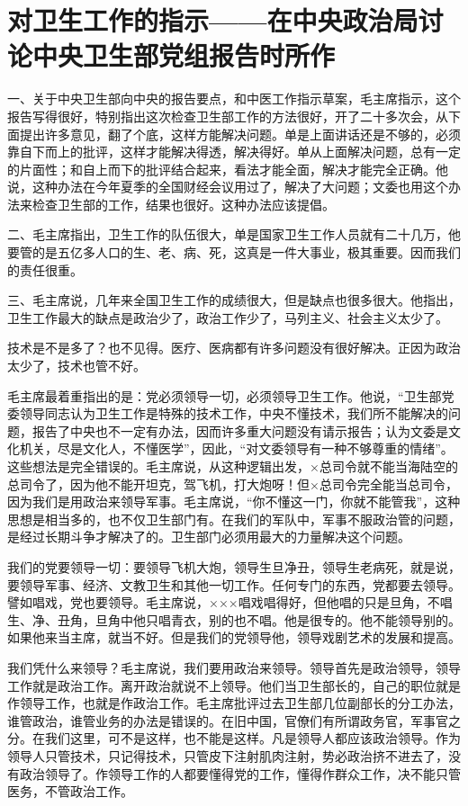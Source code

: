 \section[对卫生工作的指示——在中央政治局讨论中央卫生部党组报告时所作（一九五四年十一月）]{对卫生工作的指示——在中央政治局讨论中央卫生部党组报告时所作}


一、关于中央卫生部向中央的报告要点，和中医工作指示草案，毛主席指示，这个报告写得很好，特别指出这次检查卫生部工作的方法很好，开了二十多次会，从下面提出许多意见，翻了个底，这样方能解决问题。单是上面讲话还是不够的，必须靠自下而上的批评，这样才能解决得透，解决得好。单从上面解决问题，总有一定的片面性；和自上而下的批评结合起来，看法才能全面，解决才能完全正确。他说，这种办法在今年夏季的全国财经会议用过了，解决了大问题；文委也用这个办法来检查卫生部的工作，结果也很好。这种办法应该提倡。

二、毛主席指出，卫生工作的队伍很大，单是国家卫生工作人员就有二十几万，他要管的是五亿多人口的生、老、病、死，这真是一件大事业，极其重要。因而我们的责任很重。

三、毛主席说，几年来全国卫生工作的成绩很大，但是缺点也很多很大。他指出，卫生工作最大的缺点是政治少了，政治工作少了，马列主义、社会主义太少了。

技术是不是多了？也不见得。医疗、医病都有许多问题没有很好解决。正因为政治太少了，技术也管不好。

毛主席最着重指出的是：党必须领导一切，必须领导卫生工作。他说，“卫生部党委领导同志认为卫生工作是特殊的技术工作，中央不懂技术，我们所不能解决的问题，报告了中央也不一定有办法，因而许多重大问题没有请示报告；认为文委是文化机关，尽是文化人，不懂医学”，因此，“对文委领导有一种不够尊重的情绪”。这些想法是完全错误的。毛主席说，从这种逻辑出发，×总司令就不能当海陆空的总司令了，因为他不能开坦克，驾飞机，打大炮呀！但×总司令完全能当总司令，因为我们是用政治来领导军事。毛主席说，“你不懂这一门，你就不能管我”，这种思想是相当多的，也不仅卫生部门有。在我们的军队中，军事不服政治管的问题，是经过长期斗争才解决了的。卫生部门必须用最大的力量解决这个问题。

我们的党要领导一切：要领导飞机大炮，领导生旦净丑，领导生老病死，就是说，要领导军事、经济、文教卫生和其他一切工作。任何专门的东西，党都要去领导。譬如唱戏，党也要领导。毛主席说，×××唱戏唱得好，但他唱的只是旦角，不唱生、净、丑角，旦角中他只唱青衣，别的也不唱。他是很专的。他不能领导别的。如果他来当主席，就当不好。但是我们的党领导他，领导戏剧艺术的发展和提高。

我们凭什么来领导？毛主席说，我们要用政治来领导。领导首先是政治领导，领导工作就是政治工作。离开政治就说不上领导。他们当卫生部长的，自己的职位就是作领导工作，也就是作政治工作。毛主席批评过去卫生部几位副部长的分工办法，谁管政治，谁管业务的办法是错误的。在旧中国，官僚们有所谓政务官，军事官之分。在我们这里，可不是这样，也不能是这样。凡是领导人都应该政治领导。作为领导人只管技术，只记得技术，只管皮下注射肌肉注射，势必政治挤不进去了，没有政治领导了。作领导工作的人都要懂得党的工作，懂得作群众工作，决不能只管医务，不管政治工作。

